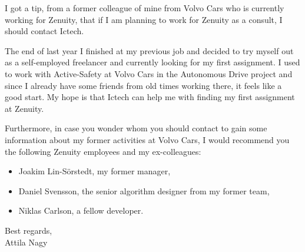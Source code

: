 I got a tip, from a former colleague of mine from Volvo Cars who is currently working for Zenuity, that if I am planning to work for Zenuity as a consult, I should contact Ictech.

The end of last year I finished at my previous job and decided to try myself out as a self-employed freelancer and currently looking for my first assignment. I used to work with Active-Safety at Volvo Cars in the Autonomous Drive project and since I already have some friends from old times working there, it feels like a good start. My hope is that Ictech can help me with finding my first assignment at Zenuity.

Furthermore, in case you wonder whom you should contact to gain some information about my former activities at Volvo Cars, I would recommend you the following Zenuity employees and my ex-colleagues:

\begin{itemize}[noitemsep]
    \item Joakim Lin-Sörstedt, my former manager,
    \item Daniel Svensson, the senior algorithm designer from my former team,
    \item Niklas Carlson, a fellow developer.
\end{itemize}

\hspace*{\fill}Best regards,\\
\hspace*{\fill}Attila Nagy
